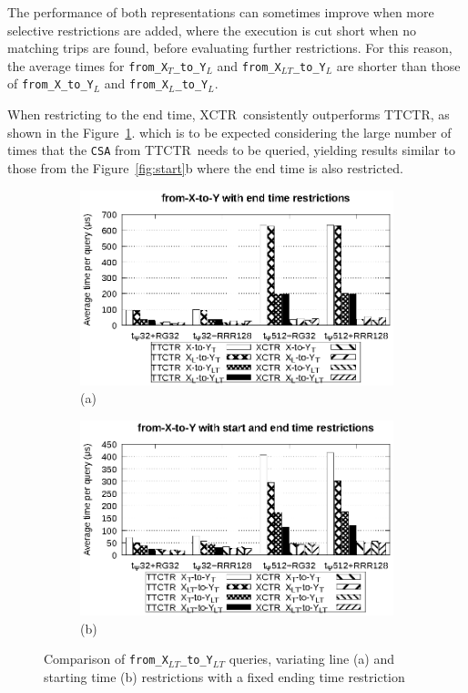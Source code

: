 \documentclass[runningheads]{llncs}
\newcommand{\ctr}{XCTR}
\newcommand{\ttctr}{TTCTR}
\begin{document}
The performance of both representations can sometimes improve  when more selective restrictions are added, where the execution is cut short when no matching trips are found, before evaluating further restrictions. For this reason, the average times for \texttt{from\_X$_{T}$\_to\_Y$_{L}$} and \texttt{from\_X$_{LT}$\_to\_Y$_{L}$} are shorter than those of \texttt{from\_X\_to\_Y$_{L}$} and \texttt{from\_X$_{L}$\_to\_Y$_{L}$}.

When restricting to the end time, \ctr~consistently outperforms \ttctr, as shown in the Figure~\ref{fig:xy2}. which is to be expected considering the large number of times that the \texttt{CSA} from \ttctr~needs to be queried, yielding results similar to those from the Figure~\ref{fig:start}b where the end time is also restricted.

\begin{figure}[hbt!]
\begin{subfigure}{0.5\linewidth}
\includegraphics[width=\linewidth]{experiments/xy2.eps}
\vspace{-12pt}
\caption{\footnotesize (a)}
\vspace{-12pt}
\end{subfigure}%
\begin{subfigure}{0.5\linewidth}
\includegraphics[width=\linewidth]{experiments/xy3.eps}
\vspace{-12pt}
\caption{\footnotesize (b)}
\vspace{-12pt}
\end{subfigure}
\caption{Comparison of \texttt{from\_X$_{LT}$\_to\_Y$_{LT}$} queries, variating line (a) and starting time (b) restrictions with a fixed ending time restriction}
\label{fig:xy2}
\end{figure}
\end{document}
